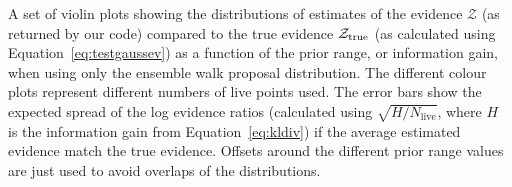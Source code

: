 \label{fig:walkpropevs}
A set of violin plots showing the distributions of estimates of the evidence
$\mathcal{Z}$ (as returned by our code) compared to the true evidence $\mathcal{Z}_{\rm true}$ (as
calculated using Equation~\ref{eq:testgaussev}) as a function of the prior range,
or information gain, when using only the ensemble walk proposal
distribution. The different colour plots represent different numbers
of live points used.  The error bars show the expected spread of the log evidence ratios (calculated using
$\sqrt{H/N_{\text{live}}}$, where $H$ is the information gain from Equation~\ref{eq:kldiv}) if the average estimated
evidence match the true evidence. Offsets around the different prior range values are just used to avoid overlaps of the
distributions.
